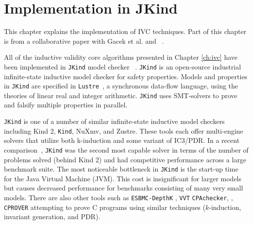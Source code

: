 \chapter{Implementation in {\sc JKind}}
\label{ch:impl}

\newcommand{\jkind}{\texttt{JKind}\xspace}
\newcommand{\kind}{\texttt{Kind}\xspace}
\newcommand{\jkindapi}{\texttt{JKindApi}\xspace}
\newcommand{\lustre}{\texttt{Lustre}\xspace}
\newcommand{\spear}{\texttt{SpeAR}\xspace}
\newcommand{\simpal}{\texttt{SIMPAL}\xspace}
\newcommand{\limp}{\texttt{Limp}\xspace}
\newcommand{\agree}{\texttt{AGREE}\xspace}
\newcommand{\gryphon}{\texttt{Gryphon}\xspace}

\renewcommand{\paragraph}[1]{\vspace{5pt}\noindent {\bf #1}}
\newcommand{\application}[2]{
  \paragraph{#1} \hfill {\it #2}
  \vspace{1pt}
}



This chapter explains the implementation of IVC techniques. Part of this chapter is from a collaborative paper with Gacek et al. \cite{jkindpaper} and ~\cite{jkind}.

All of the inductive validity core algorithms presented in Chapter \ref{ch:ivc} have been implemented in \texttt{JKind} model checker ~\cite{jkind}. \jkind is an
open-source industrial
infinite-state inductive model checker for safety properties. Models
and properties in \jkind are specified in
\lustre~\cite{halbwachs1991ieee}, a synchronous data-flow language,
using the theories of linear real and integer arithmetic. \jkind uses
SMT-solvers to prove and falsify multiple properties in parallel.

\jkind is one of a number of similar infinite-state inductive model
checkers including {\sc Kind 2}, \kind, {\sc NuXmv}, and {\sc
  Zustre}. These tools each offer multi-engine solvers that utilize
both k-induction and some variant of IC3/PDR. In a recent
comparison~\cite{champion2016cav}, \jkind was the second most capable
solver in terms of the number of problems solved (behind {\sc Kind 2})
and had competitive performance across a large benchmark suite. The
most noticeable bottleneck in \jkind is the start-up time for the Java
Virtual Machine (JVM). This cost is insignificant for larger models
but causes decreased performance for benchmarks consisting of many
very small models.
There are also other tools such as \texttt{ESBMC-DepthK} \cite{rocha2017model},  \texttt{VVT} \cite{beyer2016smt} \texttt{CPAchecker}, \cite{beyer2015boosting}, \texttt{CPROVER} \cite{brain2015safety} attempting to prove C programs using similar techniques ($k$-induction, invariant generation, and PDR).

